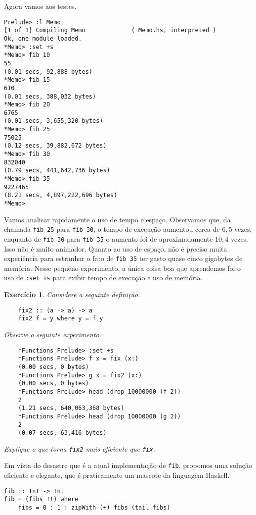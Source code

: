 \documentclass[a4paper]{article}
\newtheorem{exercicio}{Exercício}
\begin{document}
Agora vamos aos testes.

\pagebreak

\begin{verbatim}
Prelude> :l Memo
[1 of 1] Compiling Memo             ( Memo.hs, interpreted )
Ok, one module loaded.
*Memo> :set +s
*Memo> fib 10
55
(0.01 secs, 92,888 bytes)
*Memo> fib 15
610
(0.01 secs, 388,032 bytes)
*Memo> fib 20
6765
(0.01 secs, 3,655,320 bytes)
*Memo> fib 25
75025
(0.12 secs, 39,882,672 bytes)
*Memo> fib 30
832040
(0.79 secs, 441,642,736 bytes)
*Memo> fib 35
9227465
(8.21 secs, 4,897,222,696 bytes)
*Memo>
\end{verbatim}

Vamos analisar rapidamente o uso de tempo e espaço.
Observamos que, da chamada \mbox{\texttt{fib 25}} para \texttt{fib 30}, o tempo de execução aumentou cerca de $6,5$ vezes, enquanto de \texttt{fib 30} para \mbox{\texttt{fib 35}} o aumento foi de aproximadamente $10,4$ vezes.
Isso não é muito animador.
Quanto ao uso de espaço, não é preciso muita experiência para estranhar o fato de \texttt{fib 35} ter gasto quase cinco gigabytes de memória.
Nesse pequeno experimento, a única coisa boa que aprendemos foi o uso de \texttt{:set +s} para exibir tempo de execução e uso de memória.

\begin{exercicio}	\label{exercicio:fix2}
	Considere a seguinte definição.
	\begin{verbatim}
	fix2 :: (a -> a) -> a
	fix2 f = y where y = f y
	\end{verbatim}
	Observe o seguinte experimento.
	\begin{verbatim}
	*Functions Prelude> :set +s
	*Functions Prelude> f x = fix (x:)
	(0.00 secs, 0 bytes)
	*Functions Prelude> g x = fix2 (x:)
	(0.00 secs, 0 bytes)
	*Functions Prelude> head (drop 10000000 (f 2))
	2
	(1.21 secs, 640,063,368 bytes)
	*Functions Prelude> head (drop 10000000 (g 2))
	2
	(0.07 secs, 63,416 bytes)
	\end{verbatim}
	Explique o que torna \emph{\texttt{fix2}} mais eficiente que \emph{\texttt{fix}}.
\end{exercicio}

Em vista do desastre que é a atual implementação de \texttt{fib}, propomos uma solução eficiente e elegante, que é praticamente um mascote da linguagem Haskell.

\begin{verbatim}
fib :: Int -> Int
fib = (fibs !!) where
	fibs = 0 : 1 : zipWith (+) fibs (tail fibs)
\end{verbatim}
\end{document}
